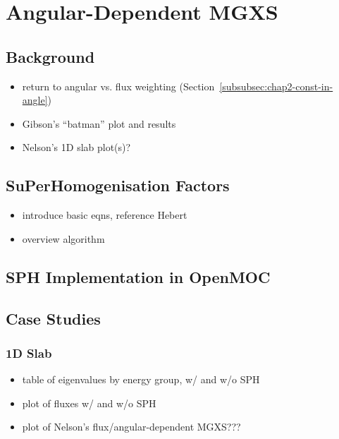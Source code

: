 \chapter{Angular-Dependent MGXS}
\label{chap:sph}


\section{Background}
\label{sec:chap5-background}

\begin{itemize}[noitemsep]
  \item return to angular vs. flux weighting (Section~\ref{subsubsec:chap2-const-in-angle})
  \item Gibson's ``batman'' plot and results
  \item Nelson's 1D slab plot(s)?
\end{itemize}


\section{SuPerHomogenisation Factors}
\label{sec:chap5-sph}

\begin{itemize}
  \item introduce basic eqns, reference Hebert
  \item overview algorithm
\end{itemize}


\section{SPH Implementation in OpenMOC}
\label{sec:chap5-sph-openmoc}


\section{Case Studies}
\label{sec:chap5-sph-results}

\subsection{1D Slab}
\label{subsubsec:chap5-sph-slab}

\begin{itemize}[noitemsep]
  \item table of eigenvalues by energy group, w/ and w/o SPH
  \item plot of fluxes w/ and w/o SPH
  \item plot of Nelson's flux/angular-dependent MGXS???
\end{itemize}

